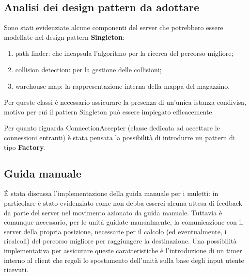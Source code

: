 \subsection{Analisi dei design pattern da adottare}

Sono stati evidenziate alcune componenti del server che potrebbero essere modellate nel design pattern \textbf{Singleton}:
\begin{enumerate}
	\item path finder: che incapsula l'algoritmo per la ricerca del percorso migliore;
	\item collision detection: per la gestione delle collisioni;
	\item warehouse map: la rappresentazione interna della mappa del magazzino.
\end{enumerate}

Per queste classi è necessario assicurare la presenza di un'unica istanza condivisa, motivo per cui il pattern Singleton può essere impiegato efficacemente.

Per quanto riguarda ConnectionAccepter (classe dedicata ad accettare le connessioni entranti) è stata pensata la possibilità di introdurre un pattern di tipo \textbf{Factory}.

\subsection{Guida manuale}

\'E stata discussa l'implementazione della guida manuale per i muletti: in particolare è stato evidenziato come non debba esserci alcuna attesa di feedback da parte del server nel movimento azionato da guida manuale. Tuttavia è comunque necessario, per le unità guidate manualmente, la comunicazione con il server della propria posizione, necessarie per il calcolo (ed eventualmente, i ricalcoli) del percorso migliore per raggiungere la destinazione.
Una possibilità implementativa per assicurare queste caratteristiche è l'introduzione di un timer interno al client che regoli lo spostamento dell'unità sulla base degli input utente ricevuti.











